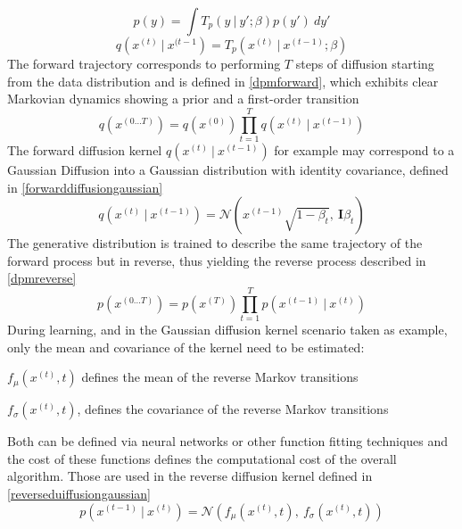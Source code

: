 \documentclass[conference]{IEEEtran}
\begin{document}
\begin{equation}
p(y)=\int T_p(y\:|\:y';\beta)p(y')\:dy'
\label{dpmpy}
\end{equation}
\begin{equation}
q\left(x^{(t)}\:|\:x^{(t-1}\right) = T_p\left(x^{(t)}\:|\:x^{(t-1)};\beta\right)
\label{dpmqx}
\end{equation}
The forward trajectory corresponds to performing $T$ steps of diffusion starting from the data distribution and is defined in \eqref{dpmforward}, which exhibits clear Markovian dynamics showing a prior and a first-order transition
\begin{equation}
q\left(x^{(0\ldots T)}\right)=q\left(x^{(0)}\right)\prod^T_{t=1}q\left(x^{(t)}\:|\:x^{(t-1)}\right)
\label{dpmforward}
\end{equation}
The forward diffusion kernel $q\left(x^{(t)}\:|\:x^{(t-1)}\right)$ for example may correspond to a Gaussian Diffusion into a Gaussian distribution with identity covariance, defined in \eqref{forwarddiffusiongaussian}
\begin{equation}
q\left(x^{(t)}\:|\:x^{(t-1)}\right) = \mathcal{N}\left(x^{(t-1)}\sqrt{1-\beta_t},\:\mathbf{I}\beta_t\right)
\label{forwarddiffusiongaussian}
\end{equation}
The generative distribution is trained to describe the same trajectory of the forward process but in reverse, thus yielding the reverse process described in \eqref{dpmreverse}
\begin{equation}
p\left(x^{(0\ldots T)}\right)=p\left(x^{(T)}\right)\prod^T_{t=1}p\left(x^{(t-1)}\:|\:x^{(t)}\right)
\label{dpmreverse}
\end{equation}
During learning, and in the Gaussian diffusion kernel scenario taken as example, only the mean and covariance of the kernel need to be estimated:
\begin{list}{-}{}
	\item $f_\mu(x^{(t)}, t)$ defines the mean of the reverse Markov transitions
	\item $f_\sigma(x^{(t)}, t)$, defines the covariance of the reverse Markov transitions
\end{list}
Both can be defined via neural networks or other function fitting techniques and the cost of these functions defines the computational cost of the overall algorithm. Those are used in the reverse diffusion kernel defined in \eqref{reverseduiffusiongaussian}
\begin{equation}
p\left(x^{(t-1)}\:|\:x^{(t)}\right)=\mathcal{N}\left(f_\mu(x^{(t)},t),\:f_\sigma(x^{(t)},t)\right)
\label{reverseduiffusiongaussian}
\end{equation}
\end{document}
